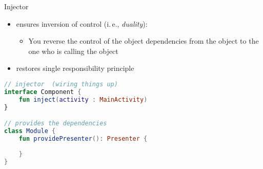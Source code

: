 \documentclass[10pt]{beamer}
\providecommand{\ie}{i.\,e.}
\begin{document}
\begin{frame}[fragile]
	Injector 
	\begin{itemize}
		\item ensures inversion of control (\ie, \emph{duality}): 
			\begin{itemize}
				\item You reverse the control of the object dependencies from the object to the one who is calling the object
			\end{itemize}
		\item restores single responsibility principle 
	\end{itemize}
\end{frame}
\begin{frame}[fragile]
\begin{lstlisting}[language=Kotlin, basicstyle=\ttfamily]
// injector  (wiring things up) 
interface Component {
    fun inject(activity : MainActivity)
}

// provides the dependencies 
class Module {
    fun providePresenter(): Presenter {
        
    }
}
\end{lstlisting} 
\end{frame}
\end{document}
